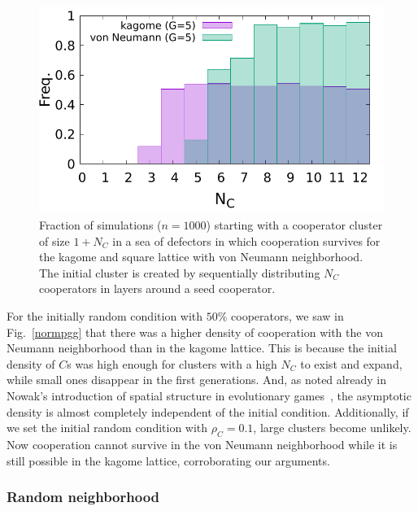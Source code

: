 \documentclass[5p,review]{elsarticle}
\begin{document}
\begin{figure}[t]
    \centering
   \includegraphics[width=\linewidth]{figs/fig6.pdf}
        \caption{Fraction of simulations ($n=1000$) starting with a cooperator cluster of size $1+N_C$ in a sea of defectors in which cooperation survives for the kagome and square lattice with von Neumann neighborhood. The initial cluster is created by sequentially distributing $N_C$ cooperators in layers around a seed cooperator.
        }
    \label{dif}
\end{figure}


For the initially random condition with $50\%$ cooperators, we saw in Fig.~\ref{normpgg} that there was a higher density of cooperation with the von Neumann neighborhood than in the kagome lattice. 
% 
This is because the initial density of $C$s was high enough for clusters with a high $N_C$ to exist and expand, while small ones disappear in the first generations. And, as noted already in Nowak's introduction of spatial structure in evolutionary games~\cite{Nowak1992a}, the asymptotic density is almost completely independent of the initial condition.
%
Additionally, if we set the initial random condition with $\rho_C = 0.1$, large clusters become unlikely. Now cooperation cannot survive in the von Neumann neighborhood while it is still possible in the kagome lattice, corroborating our arguments.
 


\subsubsection*{Random neighborhood}
\label{sec_rand_PGG}
\end{document}
